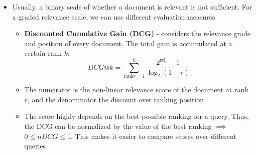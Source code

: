 \begin{itemize}
	\item Usually, a binary scale of whether a document is relevant is not sufficient. For a graded relevance scale, we can use different evaluation measures
	\begin{itemize}
		\item \textbf{Discounted Cumulative Gain (DCG)} - considers the relevance grade and position of every document. The total gain is accumulated at a certain rank $k$:
		$$DCG@k = \sum\limits_{\text{rank} r=1}^{k} \frac{2^{\text{rel}_r} - 1}{\log_2\left(1 + r\right)}$$
		\item The numerator is the non-linear relevance score of the document at rank $r$, and the denominator the discount over ranking position
		\item The score highly depends on the best possible ranking for a query. Thus, the DCG can be normalized by the value of the best ranking $\implies$ $0\leq nDCG \leq 1$. This makes it easier to compare scores over different queries
	\end{itemize}
\end{itemize}
